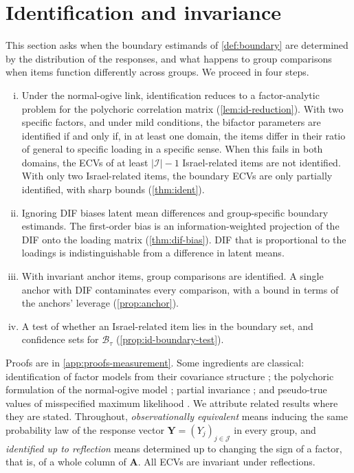 \section{Identification and invariance}\label{sec:identification}

This section asks when the boundary estimands of \cref{def:boundary} are determined by the distribution of the responses, and what happens to group comparisons when items function differently across groups. We proceed in four steps.
\begin{enumerate}[(i)]
  \item Under the normal-ogive link, identification reduces to a factor-analytic problem for the polychoric correlation matrix (\cref{lem:id-reduction}). With two specific factors, and under mild conditions, the bifactor parameters are identified if and only if, in at least one domain, the items differ in their ratio of general to specific loading in a specific sense. When this fails in both domains, the ECVs of at least $|\mathcal I|-1$ Israel-related items are not identified. With only two Israel-related items, the boundary ECVs are only partially identified, with sharp bounds (\cref{thm:ident}).
  \item Ignoring DIF biases latent mean differences and group-specific boundary estimands. The first-order bias is an information-weighted projection of the DIF onto the loading matrix (\cref{thm:dif-bias}). DIF that is proportional to the loadings is indistinguishable from a difference in latent means.
  \item With invariant anchor items, group comparisons are identified. A single anchor with DIF contaminates every comparison, with a bound in terms of the anchors' leverage (\cref{prop:anchor}).
  \item A test of whether an Israel-related item lies in the boundary set, and confidence sets for $\mathcal B_\tau$ (\cref{prop:id-boundary-test}).
\end{enumerate}
Proofs are in \cref{app:proofs-measurement}. Some ingredients are classical: identification of factor models from their covariance structure \citep{anderson1956,bollen1989}; the polychoric formulation of the normal-ogive model \citep{olsson1979,takane1987}; partial invariance \citep{byrne1989}; and pseudo-true values of misspecified maximum likelihood \citep{white1982}. We attribute related results where they are stated. Throughout, \emph{observationally equivalent} means inducing the same probability law of the response vector $\bm Y=(Y_j)_{j\in\mathcal J}$ in every group, and \emph{identified up to reflection} means determined up to changing the sign of a factor, that is, of a whole column of $\bm A$. All ECVs are invariant under reflections.


